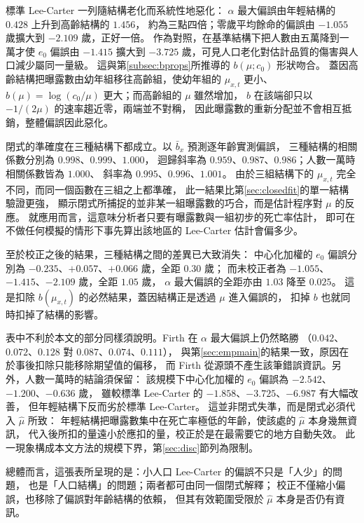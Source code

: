 \documentclass[UTF8, fontset=macnew, a4paper, 12pt]{ctexart}
\begin{document}
標準 Lee-Carter 一列隨結構老化而系統性地惡化：
$\alpha$ 最大偏誤由年輕結構的 $0.428$ 上升到高齡結構的 $1.456$，
約為三點四倍；零歲平均餘命的偏誤由 $-1.055$ 歲擴大到 $-2.109$ 歲，正好一倍。
作為對照，在基準結構下把人數由五萬降到一萬才使 $e_0$ 偏誤由 $-1.415$
擴大到 $-3.725$ 歲，可見人口老化對估計品質的傷害與人口減少屬同一量級。
這與第\ref{subsec:bprops}所推導的 $b(\mu;c_0)$ 形狀吻合。
蓋因高齡結構把曝露數由幼年組移往高齡組，使幼年組的 $\mu_{x,t}$ 更小、
$b(\mu)=\log(c_0/\mu)$ 更大；而高齡組的 $\mu$ 雖然增加，
$b$ 在該端卻只以 $-1/(2\mu)$ 的速率趨近零，兩端並不對稱，
因此曝露數的重新分配並不會相互抵銷，整體偏誤因此惡化。

閉式的準確度在三種結構下都成立。以 $\bar b_x$ 預測逐年齡實測偏誤，
三種結構的相關係數分別為 $0.998$、$0.999$、$1.000$，
迴歸斜率為 $0.959$、$0.987$、$0.986$；人數一萬時相關係數皆為 $1.000$、
斜率為 $0.995$、$0.996$、$1.001$。
由於三組結構下的 $\mu_{x,t}$ 完全不同，而同一個函數在三組之上都準確，
此一結果比第\ref{sec:closedfit}的單一結構驗證更強，
顯示閉式所捕捉的並非某一組曝露數的巧合，而是估計程序對 $\mu$ 的反應。
就應用而言，這意味分析者只要有曝露數與一組初步的死亡率估計，
即可在不做任何模擬的情形下事先算出該地區的 Lee-Carter 估計會偏多少。

至於校正之後的結果，三種結構之間的差異已大致消失：
中心化加權的 $e_0$ 偏誤分別為 $-0.235$、$+0.057$、$+0.066$ 歲，全距 $0.30$ 歲；
而未校正者為 $-1.055$、$-1.415$、$-2.109$ 歲，全距 $1.05$ 歲，
$\alpha$ 最大偏誤的全距亦由 $1.03$ 降至 $0.025$。
這是扣除 $b(\mu_{x,t})$ 的必然結果，蓋因結構正是透過 $\mu$ 進入偏誤的，
扣掉 $b$ 也就同時扣掉了結構的影響。

表中不利於本文的部分同樣須說明。Firth 在 $\alpha$ 最大偏誤上仍然略勝
（$0.042$、$0.072$、$0.128$ 對 $0.087$、$0.074$、$0.111$），
與第\ref{sec:empmain}的結果一致，原因在於事後扣除只能移除期望值的偏移，
而 Firth 從源頭不產生該筆錯誤資訊。另外，人數一萬時的結論須保留：
該規模下中心化加權的 $e_0$ 偏誤為 $-2.542$、$-1.200$、$-0.636$ 歲，
雖較標準 Lee-Carter 的 $-1.858$、$-3.725$、$-6.987$ 有大幅改善，
但年輕結構下反而劣於標準 Lee-Carter。
這並非閉式失準，而是閉式必須代入 $\hat\mu$ 所致：
年輕結構把曝露數集中在死亡率極低的年齡，使該處的 $\hat\mu$ 本身幾無資訊，
代入後所扣的量遠小於應扣的量，校正於是在最需要它的地方自動失效。
此一現象構成本文方法的規模下界，第\ref{sec:disc}節列為限制。

總體而言，這張表所呈現的是：小人口 Lee-Carter 的偏誤不只是「人少」的問題，
也是「人口結構」的問題；兩者都可由同一個閉式解釋；
校正不僅縮小偏誤，也移除了偏誤對年齡結構的依賴，
但其有效範圍受限於 $\hat\mu$ 本身是否仍有資訊。
\end{document}
